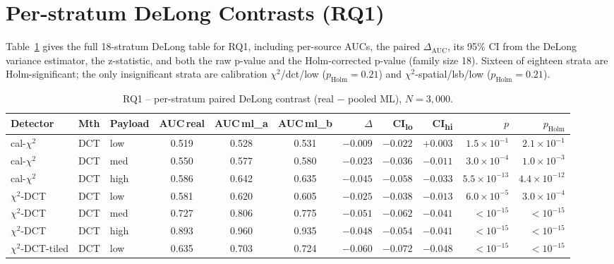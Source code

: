 \documentclass[10pt,twocolumn,a4paper]{article}
\begin{document}
\section{Per-stratum DeLong Contrasts (RQ1)}
\label{app:rq1-delong}
Table~\ref{tab:appendix-rq1} gives the full 18-stratum DeLong table for RQ1, including per-source AUCs, the paired $\Delta_\text{AUC}$, its 95\% CI from the DeLong variance estimator, the z-statistic, and both the raw p-value and the Holm-corrected p-value (family size 18). Sixteen of eighteen strata are Holm-significant; the only insignificant strata are calibration $\chi^2$/dct/low ($p_\text{Holm}\!=\!0.21$) and $\chi^2$-spatial/lsb/low ($p_\text{Holm}\!=\!0.21$).

\begin{table}[h]
\centering\footnotesize
\caption{RQ1 -- per-stratum paired DeLong contrast (real $-$ pooled ML), $N\!=\!3{,}000$.}
\label{tab:appendix-rq1}
\setlength{\tabcolsep}{4pt}\renewcommand{\arraystretch}{1.1}
\begin{tabular}{@{}l l l c c c r r r r r@{}}
\toprule
\textbf{Detector} & \textbf{Mth} & \textbf{Payload} & \textbf{AUC\,real} & \textbf{AUC\,ml\_a} & \textbf{AUC\,ml\_b} & \textbf{$\Delta$} & \textbf{CI\textsubscript{lo}} & \textbf{CI\textsubscript{hi}} & \textbf{$p$} & \textbf{$p_\text{Holm}$} \\
\midrule
cal-$\chi^2$         & DCT & low    & 0.519 & 0.528 & 0.531 & $-0.009$ & $-0.022$ & $+0.003$ & $1.5\!\times\!10^{-1}$ & $2.1\!\times\!10^{-1}$ \\
cal-$\chi^2$         & DCT & med    & 0.550 & 0.577 & 0.580 & $-0.023$ & $-0.036$ & $-0.011$ & $3.0\!\times\!10^{-4}$ & $1.0\!\times\!10^{-3}$ \\
cal-$\chi^2$         & DCT & high   & 0.586 & 0.642 & 0.635 & $-0.045$ & $-0.058$ & $-0.033$ & $5.5\!\times\!10^{-13}$ & $4.4\!\times\!10^{-12}$ \\
$\chi^2$-DCT         & DCT & low    & 0.581 & 0.620 & 0.605 & $-0.025$ & $-0.038$ & $-0.013$ & $6.0\!\times\!10^{-5}$ & $3.0\!\times\!10^{-4}$ \\
$\chi^2$-DCT         & DCT & med    & 0.727 & 0.806 & 0.775 & $-0.051$ & $-0.062$ & $-0.041$ & $<\!10^{-15}$           & $<\!10^{-15}$ \\
$\chi^2$-DCT         & DCT & high   & 0.893 & 0.960 & 0.935 & $-0.048$ & $-0.054$ & $-0.041$ & $<\!10^{-15}$           & $<\!10^{-15}$ \\
$\chi^2$-DCT-tiled   & DCT & low    & 0.635 & 0.703 & 0.724 & $-0.060$ & $-0.072$ & $-0.048$ & $<\!10^{-15}$           & $<\!10^{-15}$ \\

\end{tabular}
\end{table}
\end{document}
